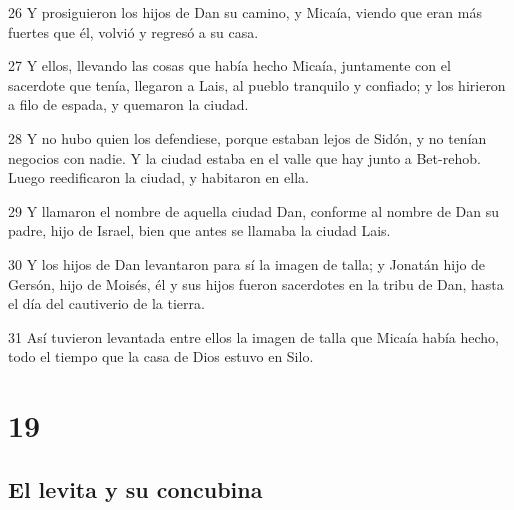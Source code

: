 \par 26 Y prosiguieron los hijos de Dan su camino, y Micaía, viendo que eran más fuertes que él, volvió y regresó a su casa.
\par 27 Y ellos, llevando las cosas que había hecho Micaía, juntamente con el sacerdote que tenía, llegaron a Lais, al pueblo tranquilo y confiado; y los hirieron a filo de espada, y quemaron la ciudad.
\par 28 Y no hubo quien los defendiese, porque estaban lejos de Sidón, y no tenían negocios con nadie. Y la ciudad estaba en el valle que hay junto a Bet-rehob. Luego reedificaron la ciudad, y habitaron en ella.
\par 29 Y llamaron el nombre de aquella ciudad Dan, conforme al nombre de Dan su padre, hijo de Israel, bien que antes se llamaba la ciudad Lais.
\par 30 Y los hijos de Dan levantaron para sí la imagen de talla; y Jonatán hijo de Gersón, hijo de Moisés, él y sus hijos fueron sacerdotes en la tribu de Dan, hasta el día del cautiverio de la tierra.
\par 31 Así tuvieron levantada entre ellos la imagen de talla que Micaía había hecho, todo el tiempo que la casa de Dios estuvo en Silo.

\chapter{19}

\section*{El levita y su concubina}

